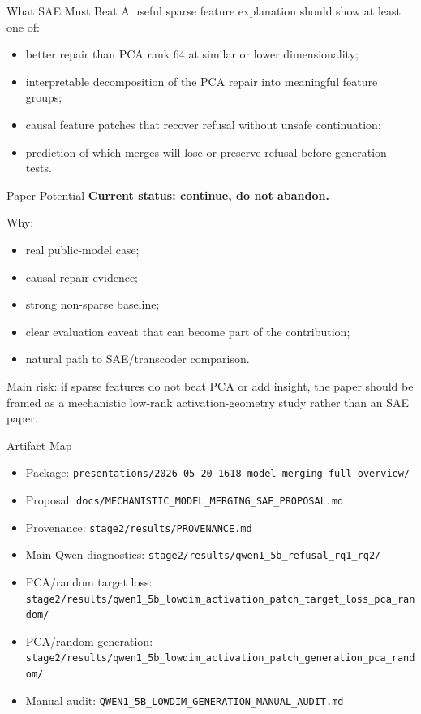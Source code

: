 \documentclass[aspectratio=169]{beamer}
\begin{document}
\begin{frame}{What SAE Must Beat}
  A useful sparse feature explanation should show at least one of:

  \begin{itemize}
    \item better repair than PCA rank 64 at similar or lower dimensionality;
    \item interpretable decomposition of the PCA repair into meaningful feature groups;
    \item causal feature patches that recover refusal without unsafe continuation;
    \item prediction of which merges will lose or preserve refusal before generation tests.
  \end{itemize}
\end{frame}

\begin{frame}{Paper Potential}
  \textbf{Current status: continue, do not abandon.}

  \vspace{0.25cm}
  Why:
  \begin{itemize}
    \item real public-model case;
    \item causal repair evidence;
    \item strong non-sparse baseline;
    \item clear evaluation caveat that can become part of the contribution;
    \item natural path to SAE/transcoder comparison.
  \end{itemize}

  \vspace{0.2cm}
  Main risk: if sparse features do not beat PCA or add insight, the paper should be framed as a mechanistic low-rank activation-geometry study rather than an SAE paper.
\end{frame}

\begin{frame}{Artifact Map}
  \small
  \begin{itemize}
    \item Package: \texttt{presentations/2026-05-20-1618-model-merging-full-overview/}
    \item Proposal: \texttt{docs/MECHANISTIC\_MODEL\_MERGING\_SAE\_PROPOSAL.md}
    \item Provenance: \texttt{stage2/results/PROVENANCE.md}
    \item Main Qwen diagnostics: \texttt{stage2/results/qwen1\_5b\_refusal\_rq1\_rq2/}
    \item PCA/random target loss: \texttt{stage2/results/qwen1\_5b\_lowdim\_activation\_patch\_target\_loss\_pca\_random/}
    \item PCA/random generation: \texttt{stage2/results/qwen1\_5b\_lowdim\_activation\_patch\_generation\_pca\_random/}
    \item Manual audit: \texttt{QWEN1\_5B\_LOWDIM\_GENERATION\_MANUAL\_AUDIT.md}
  \end{itemize}
\end{frame}
\end{document}
